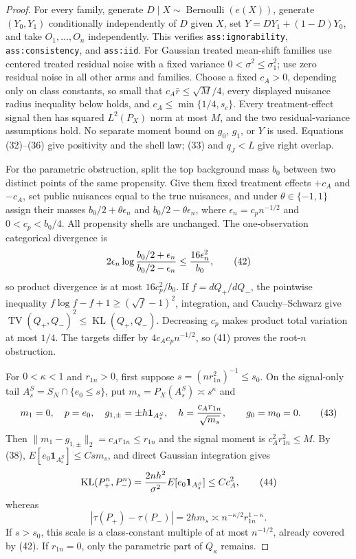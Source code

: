 \documentclass{article}
\begin{document}
\begin{proof}
For every family, generate \(D\mid X\sim\operatorname{Bernoulli}(e(X))\),
generate \((Y_0,Y_1)\) conditionally independently of \(D\) given \(X\), set
\(Y=DY_1+(1-D)Y_0\), and take \(O_1,\ldots,O_n\) independently.  This verifies
\texttt{ass:ignorability}, \texttt{ass:consistency}, and \texttt{ass:iid}.
For Gaussian treated mean-shift families use centered treated residual noise
with a fixed variance \(0<\sigma^2\leq\sigma_1^2\); use zero residual noise in
all other arms and families.  Choose a fixed \(c_A>0\), depending only on class
constants, so small that \(c_A\bar r\leq\sqrt M/4\), every displayed nuisance
radius inequality below holds, and \(c_A\leq\min\{1/4,s_c\}\).  Every
treatment-effect signal then has squared \(L^2(P_X)\) norm at most \(M\), and
the two residual-variance assumptions hold.  No separate moment bound on
\(g_0\), \(g_1\), or \(Y\) is used.  Equations (32)--(36) give positivity and
the shell law; (33) and \(q_J<L\) give right overlap.

For the parametric obstruction, split the top background mass \(b_0\) between
two distinct points of the same propensity.  Give them fixed treatment effects
\(+c_A\) and \(-c_A\), set public nuisances equal to the true nuisances, and
under \(\theta\in\{-1,1\}\) assign their masses
\(b_0/2+\theta\epsilon_n\) and \(b_0/2-\theta\epsilon_n\), where
\(\epsilon_n=c_pn^{-1/2}\) and \(0<c_p<b_0/4\).  All propensity shells are
unchanged.  The one-observation categorical divergence is
\[
2\epsilon_n\log{b_0/2+\epsilon_n\over b_0/2-\epsilon_n}
\leq{16\epsilon_n^2\over b_0},                            \tag{42}
\]
so product divergence is at most \(16c_p^2/b_0\).  If \(f=dQ_+/dQ_-\), the
pointwise inequality \(f\log f-f+1\geq(\sqrt f-1)^2\), integration, and
Cauchy--Schwarz give
\(\operatorname{TV}(Q_+,Q_-)^2\leq\operatorname{KL}(Q_+,Q_-)\).
Decreasing \(c_p\) makes product total variation at most \(1/4\).  The targets
differ by \(4c_Ac_pn^{-1/2}\), so (41) proves the root-\(n\) obstruction.

For \(0<\kappa<1\) and \(r_{1n}>0\), first suppose
\(s=(nr_{1n}^2)^{-1}\leq s_0\).  On the signal-only tail
\(A_s^S=S_N\cap\{e_0\leq s\}\), put \(m_s=P_X(A_s^S)\asymp s^\kappa\) and
\[
m_1=0,\quad p=e_0,\quad
g_{1,\pm}=\pm h\mathbf 1_{A_s^S},\quad
h={c_A r_{1n}\over\sqrt{m_s}},\quad\quad g_0=m_0=0.             \tag{43}
\]
Then \(\|m_1-g_{1,\pm}\|_2=c_A r_{1n}\leq r_{1n}\) and the signal moment is
\(c_A^2r_{1n}^2\leq M\).  By (38),
\(E[e_0\mathbf 1_{A_s^S}]\leq Csm_s\), and direct Gaussian integration gives
\[
\operatorname{KL}(P_+^n,P_-^n)
={2nh^2\over\sigma^2}E[e_0\mathbf 1_{A_s^S}]
\leq Cc_A^2,                                               \tag{44}
\]
whereas
\[
|\tau(P_+)-\tau(P_-)|=2hm_s
\asymp n^{-\kappa/2}r_{1n}^{1-\kappa}.                    \tag{45}
\]
If \(s>s_0\), this scale is a class-constant multiple of at most
\(n^{-1/2}\), already covered by (42).  If \(r_{1n}=0\), only the parametric
part of \(Q_\kappa\) remains.


\end{proof}
\end{document}
